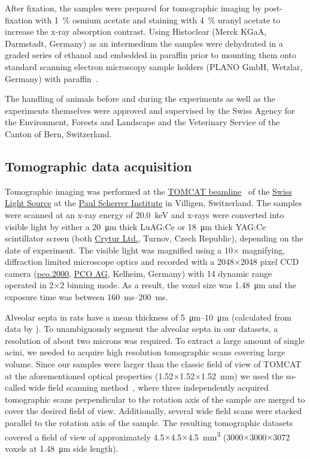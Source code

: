\documentclass[a4paper,DIV=calc,abstract,english]{scrartcl}
\begin{document}
After fixation, the samples were prepared for tomographic imaging by post-fixation with \SI{1}{\percent} osmium acetate and staining with \SI{4}{\percent} uranyl acetate to increase the x-ray absorption contrast.
Using Histoclear (Merck KGaA, Darmstadt, Germany) as an intermedium the samples were dehydrated in a graded series of ethanol and embedded in paraffin prior to mounting them onto standard scanning electron microscopy sample holders (PLANO GmbH, Wetzlar, Germany) with paraffin~\cite{Tsuda2008}.

The handling of animals before and during the experiments as well as the experiments themselves were approved and supervised by the Swiss Agency for the Environment, Forests and Landscape and the Veterinary Service of the Canton of Bern, Switzerland.

\subsection{Tomographic data acquisition}
Tomographic imaging was performed at the \href{http://www.psi.ch/sls/tomcat/}{TOMCAT beamline}~\cite{Stampanoni2006a} of the \href{http://www.psi.ch/sls/}{Swiss Light Source} at the \href{http://www.psi.ch/}{Paul Scherrer Institute} in Villigen, Switzerland.
The samples were scanned at an x-ray energy of \SI{20.0}{\kilo\electronvolt} and x-rays were converted into visible light by either a \SI{20}{\micro\meter} thick LuAG:Ce or \SI{18}{\micro\meter} thick YAG:Ce scintillator screen (both \href{http://www.crytur.cz/}{Crytur Ltd.}, Turnov, Czech Republic), depending on the date of experiment.
The visible light was magnified using a 10\(\times\) magnifying, diffraction limited microscope optics and recorded with a 2048\(\times\)2048 pixel CCD camera (\href{http://www.pco.de/sensitive-cameras/pco2000/}{pco.2000}, \href{http://www.pco.de/}{PCO AG}, Kelheim, Germany) with \SI{14}{\bit} dynamic range operated in 2\(\times\)2 binning mode.
As a result, the voxel size was \SI{1.48}{\micro\meter} and the exposure time was between \SIrange{160}{200}{\milli\second}.

Alveolar septa in rats have a mean thickness of \SIrange{5}{10}{\micro\meter} (calculated from data by \citet{Burri1974}).
To unambiguously segment the alveolar septa in our datasets, a resolution of  about two microns was required.
To extract a large amount of single acini, we needed to acquire high resolution tomographic scans covering large volume.
Since our samples were larger than the classic field of view of TOMCAT at the aforementioned optical properties (1.52\(\times\)1.52\(\times\)\SI{1.52}{\milli\meter}) we used the so-called wide field scanning method~\cite{Haberthuer2010a}, where three independently acquired tomographic scans perpendicular to the rotation axis of the sample are merged to cover the desired field of view.
Additionally, several wide field scans were stacked parallel to the rotation axis of the sample.
The resulting tomographic datasets covered a field of view of approximately 4.5\(\times\)4.5\(\times\)\SI{4.5}{\milli\meter\cubed} (3000\(\times\)3000\(\times\)3072 voxels at \SI{1.48}{\micro\meter} side length).
\end{document}
